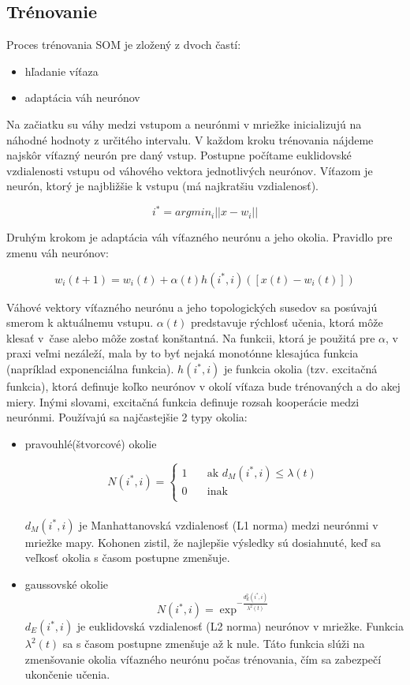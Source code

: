 \subsection{Trénovanie}
Proces trénovania SOM je zložený z dvoch častí:
\begin{itemize}
\item hľadanie víťaza
\item adaptácia váh neurónov
\end{itemize}
Na začiatku su váhy medzi vstupom a neurónmi v mriežke inicializujú na náhodné hodnoty z určitého intervalu.
V každom kroku trénovania nájdeme najskôr víťazný neurón pre daný vstup. Postupne počítame euklidovské vzdialenosti vstupu od váhového vektora jednotlivých neurónov. Víťazom je neurón, ktorý je najbližšie k vstupu (má najkratšiu vzdialenosť).

\begin{equation}
i^* = argmin_i||x-w_i|| 
\end{equation}

Druhým krokom je adaptácia váh víťazného neurónu a jeho okolia. Pravidlo pre zmenu váh neurónov:

\begin{equation}
w_i(t+1) = w_i(t) + \alpha(t)h(i^*, i)([x(t) - w_i(t)])
\end{equation}

Váhové vektory víťazného neurónu a jeho topologických susedov sa posúvajú smerom k aktuálnemu vstupu.
$\alpha(t)$ predstavuje rýchlosť učenia, ktorá môže klesať v~čase alebo môže zostať konštantná. Na funkcii, ktorá je použitá pre $\alpha$, v praxi veľmi nezáleží, mala by to byť nejaká monotónne klesajúca funkcia (napríklad exponenciálna funkcia). 
$h(i^*, i)$ je funkcia okolia (tzv. excitačná funkcia), ktorá definuje koľko neurónov v okolí víťaza bude trénovaných a do akej miery. Inými slovami, excitačná funkcia definuje rozsah kooperácie medzi neurónmi. Používajú sa najčastejšie 2 typy okolia:
\begin{itemize}
\item pravouhlé(štvorcové) okolie

\[
N(i^{*},i) =
     \begin{cases}
       \text{1} &\quad\text{ak } d_{M}(i^*, i) \leq \lambda(t) \\
       \text{0} &\quad\text{inak}\\
     \end{cases}
\]
\\
$d_{M}(i^{*}, i)$ je Manhattanovská vzdialenosť (L1 norma) medzi neurónmi v mriežke mapy. Kohonen zistil, že najlepšie výsledky sú dosiahnuté, keď
sa veľkosť okolia s časom postupne zmenšuje.
\item gaussovské okolie
	\begin{equation}
		N(i^{*}, i) = \exp^{- \frac{d^{2}_{E}(i^{*}, i)}{\lambda^{2}(t)}}
	\end{equation}
$d_{E}(i^{*}, i)$ je euklidovská vzdialenosť (L2 norma) neurónov v mriežke. Funkcia $\lambda^2(t)$ sa s časom postupne zmenšuje až k nule. Táto
	funkcia slúži na zmenšovanie okolia víťazného neurónu počas trénovania, čím sa zabezpečí ukončenie učenia.
\end{itemize}

